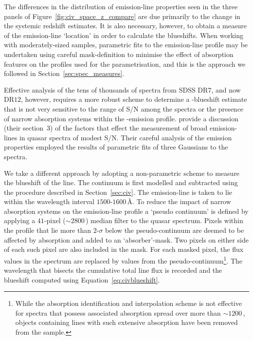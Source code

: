 The differences in the distribution of  emission-line properties seen in the three panels of Figure~\ref{fig:civ_space_z_compare} are due primarily to the change in the systemic redshift estimates.
It is also necessary, however, to obtain a measure of the  emission-line `location' in order to calculate the blueshifts.
When working with moderately-sized samples, parametric fits to the emission-line profile may be undertaken using careful mask-definition to minimise the effect of absorption features on the profiles used for the parametrisation, and this is the approach we followed in Section~\ref{sec:spec_measures}.

Effective analysis of the tens of thousands of spectra from SDSS DR$7$, and now DR$12$, however, requires a more robust scheme to determine a -blueshift estimate that is not very sensitive to the range of S/N among the spectra or the presence of narrow absorption systems within the -emission profile.
\citet{shen11} provide a discussion (their section~3) of the factors that effect the measurement of broad emission-lines in quasar spectra of modest S/N.
Their careful analysis of the  emission properties employed the results of parametric fits of three Gaussians to the spectra.

We take a different approach by adopting a non-parametric scheme to measure the blueshift of the  line.
The continuum is first modelled and subtracted using the procedure described in Section~\ref{sec:civ}.
The  emission-line is taken to lie within the wavelength interval $1500$-$1600$\,\AA.
To reduce the impact of narrow absorption systems on the emission-line profile a `pseudo continuum' is defined by applying a $41$-pixel ($\sim$$2800$\,\kms) median filter to the quasar spectrum.
Pixels within the  profile that lie more than $2$-$\sigma$ below the pseudo-continuum are deemed to be affected by absorption and added to an `absorber'-mask.
Two pixels on either side of each such pixel are also included in the mask.
For each masked pixel, the flux values in the spectrum are replaced by values from the pseudo-continuum\footnote{While the absorption identification and interpolation scheme is not effective for spectra that possess
associated absorption spread over more than $\sim1200$\,\kms, objects containing  lines with such extensive absorption have been removed from the sample.}.
The wavelength that bisects the cumulative total line flux is recorded and the blueshift computed using Equation~\ref{eq:civblueshift}.

